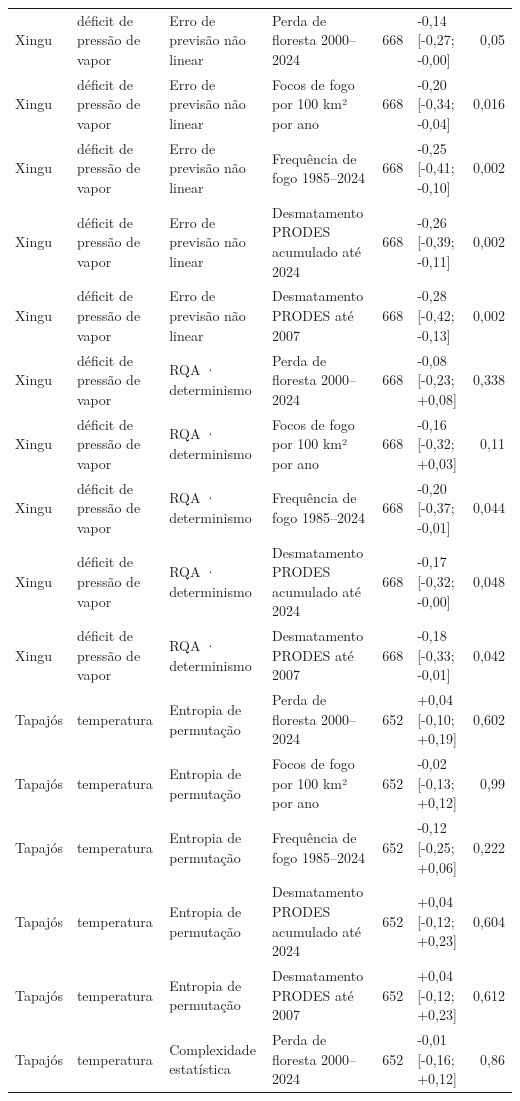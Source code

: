 \begin{table}
{\begin{tabular}{llllrlr}
Xingu & déficit de pressão de vapor & Erro de previsão não linear & Perda de floresta 2000–2024 & 668 & -0,14 [-0,27; -0,00] & 0,05 \\
Xingu & déficit de pressão de vapor & Erro de previsão não linear & Focos de fogo por 100 km² por ano & 668 & -0,20 [-0,34; -0,04] & 0,016 \\
Xingu & déficit de pressão de vapor & Erro de previsão não linear & Frequência de fogo 1985–2024 & 668 & -0,25 [-0,41; -0,10] & 0,002 \\
Xingu & déficit de pressão de vapor & Erro de previsão não linear & Desmatamento PRODES acumulado até 2024 & 668 & -0,26 [-0,39; -0,11] & 0,002 \\
Xingu & déficit de pressão de vapor & Erro de previsão não linear & Desmatamento PRODES até 2007 & 668 & -0,28 [-0,42; -0,13] & 0,002 \\
Xingu & déficit de pressão de vapor & RQA · determinismo & Perda de floresta 2000–2024 & 668 & -0,08 [-0,23; +0,08] & 0,338 \\
Xingu & déficit de pressão de vapor & RQA · determinismo & Focos de fogo por 100 km² por ano & 668 & -0,16 [-0,32; +0,03] & 0,11 \\
Xingu & déficit de pressão de vapor & RQA · determinismo & Frequência de fogo 1985–2024 & 668 & -0,20 [-0,37; -0,01] & 0,044 \\
Xingu & déficit de pressão de vapor & RQA · determinismo & Desmatamento PRODES acumulado até 2024 & 668 & -0,17 [-0,32; -0,00] & 0,048 \\
Xingu & déficit de pressão de vapor & RQA · determinismo & Desmatamento PRODES até 2007 & 668 & -0,18 [-0,33; -0,01] & 0,042 \\
Tapajós & temperatura & Entropia de permutação & Perda de floresta 2000–2024 & 652 & +0,04 [-0,10; +0,19] & 0,602 \\
Tapajós & temperatura & Entropia de permutação & Focos de fogo por 100 km² por ano & 652 & -0,02 [-0,13; +0,12] & 0,99 \\
Tapajós & temperatura & Entropia de permutação & Frequência de fogo 1985–2024 & 652 & -0,12 [-0,25; +0,06] & 0,222 \\
Tapajós & temperatura & Entropia de permutação & Desmatamento PRODES acumulado até 2024 & 652 & +0,04 [-0,12; +0,23] & 0,604 \\
Tapajós & temperatura & Entropia de permutação & Desmatamento PRODES até 2007 & 652 & +0,04 [-0,12; +0,23] & 0,612 \\
Tapajós & temperatura & Complexidade estatística & Perda de floresta 2000–2024 & 652 & -0,01 [-0,16; +0,12] & 0,86 \\

\end{tabular}}
\end{table}
